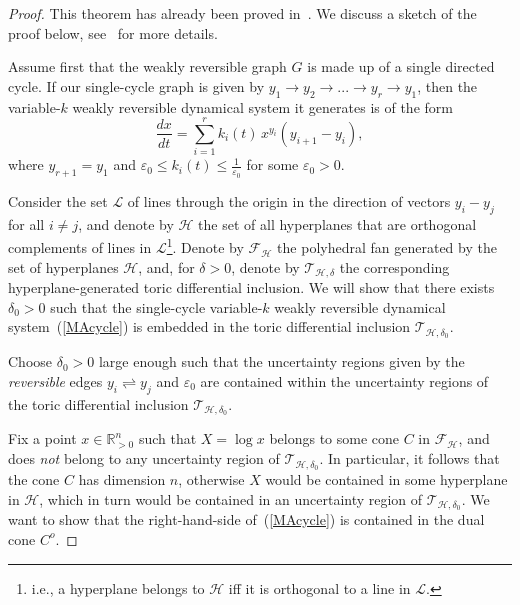 \documentclass[12pt,letterpaper]{article}
\newcommand{\T}{\mathcal{T}}
\renewcommand{\L}{\mathcal{L}}
\renewcommand{\H}{\mathcal{H}}
\newcommand{\F}{\mathcal{F}}
\newcommand{\RRp}{\mathbb{R}_{>0}}
\newcommand{\eps}{\varepsilon}
\begin{document}
\begin{proof}
This theorem has already been proved in~\cite{Craciun_SIAGA_2019}. We discuss a sketch  of the proof below, see~\cite{Craciun_SIAGA_2019} for more details.

Assume first that the weakly reversible graph $G$ is made up of a single directed cycle. 
If our single-cycle graph is given by $y_1 \to y_2 \to ... \to y_r \to y_1$, then the variable-$k$  weakly reversible dynamical system it generates is of the form 
\begin{equation}\label{MAcycle}
\frac{dx}{dt} = \sum_{i=1}^r k_i(t) \, x^{y_i} (y_{i+1} - y_i), 
\end{equation}
where $y_{r+1} = y_1$ and $\eps_0 \le k_i(t) \le \frac{1}{\eps_0}$ for some ${\eps_0}>0$.

Consider the set $\L$ of lines through the origin in the direction of vectors $y_i - y_j$ for all $i \neq j$, and denote by $\H$ the set of all hyperplanes that are orthogonal complements of lines in $\L$\footnote{i.e., a hyperplane belongs to $\H$ iff it is orthogonal to a line in $\L$.
}. 
Denote by $\F_\H$ the polyhedral fan generated by the set of hyperplanes $\H$, and, for $\delta>0$, denote by $\T_{\H,\delta}$ the corresponding hyperplane-generated toric differential inclusion. We will show that there exists $\delta_0>0$ such that the single-cycle variable-$k$  weakly reversible dynamical system~(\ref{MAcycle}) is embedded in the toric differential inclusion $\T_{\H,\delta_0}$. 

Choose $\delta_0>0$ large enough such that the uncertainty regions given by the {\em reversible} edges $y_i\rightleftharpoons y_j$ and $\eps_0$ are contained within the uncertainty regions of the toric differential inclusion $\T_{\H,\delta_0}$. 

Fix a point $x\in\RRp^n$ such that $X = \log x$ belongs to some cone $C$ in $\F_\H$, and does {\em not} belong to any uncertainty region of $\T_{\H,\delta_0}$. In particular, it follows that the cone $C$ has dimension $n$, otherwise $X$ would be contained in some hyperplane in $\H$, which in turn would be contained in an uncertainty region of $\T_{\H,\delta_0}$. We want to show that the right-hand-side of~(\ref{MAcycle}) is contained in the dual cone $C^o$. 



\end{proof}
\end{document}
